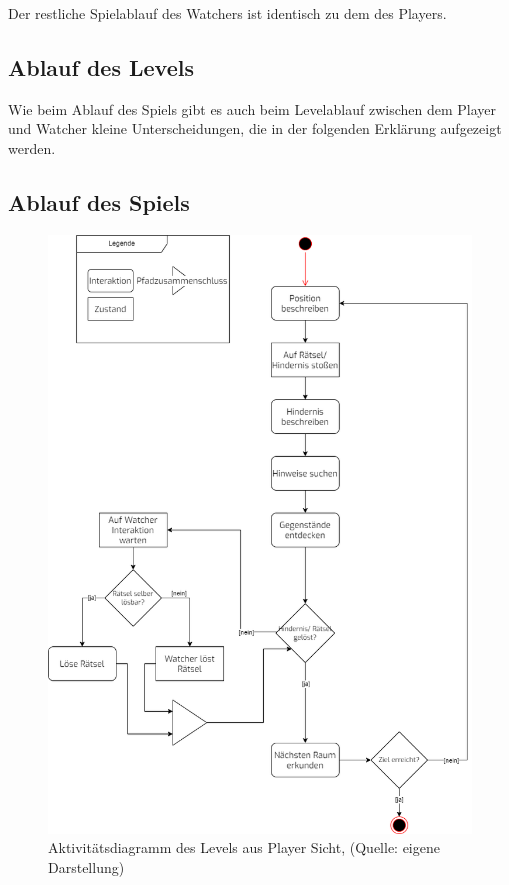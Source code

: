 Der restliche Spielablauf des Watchers ist identisch zu dem des Players.

\subsection{Ablauf des Levels}
Wie beim Ablauf des Spiels gibt es auch beim Levelablauf zwischen dem Player und Watcher kleine Unterscheidungen, die in der folgenden Erklärung aufgezeigt werden.

\subsection{Ablauf des Spiels}
\begin{figure}[ht]
\centering
\includegraphics[width=1\linewidth]{content/pictures/LevelLoop-Player.drawio.png}
\caption{Aktivitätsdiagramm des Levels aus Player Sicht, (Quelle: eigene Darstellung)}
\label{fig:level-loop-player}
\end{figure}

